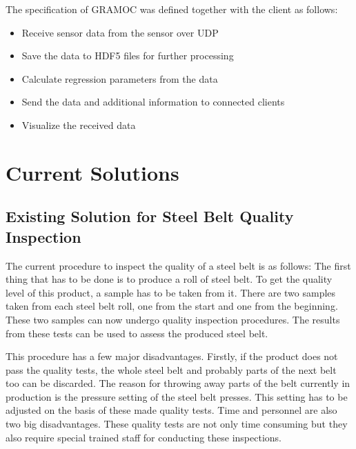 The specification of GRAMOC was defined together with the client as follows:

\begin{itemize}
    \item Receive sensor data from the sensor over UDP
    \item Save the data to HDF5 files for further processing
    \item Calculate regression parameters from the data
    \item Send the data and additional information to connected clients
    \item Visualize the received data
\end{itemize}

\section{Current Solutions}



\subsection{Existing Solution for Steel Belt Quality Inspection}

The current procedure to inspect the quality of a steel belt is as follows: The first thing that has to be done is to produce a roll of steel belt. To get the quality level of this product, a sample has to be taken from it. There are two samples taken from each steel belt roll, one from the start and one from the beginning. These two samples can now undergo quality inspection procedures. The results from these tests can be used to assess the produced steel belt.

This procedure has a few major disadvantages. Firstly, if the product does not pass the quality tests, the whole steel belt and probably parts of the next belt too can be discarded. The reason for throwing away parts of the belt currently in production is the pressure setting of the steel belt presses. This setting has to be adjusted on the basis of these made quality tests. Time and personnel are also two big disadvantages. These quality tests are not only time consuming but they also require special trained staff for conducting these inspections.

